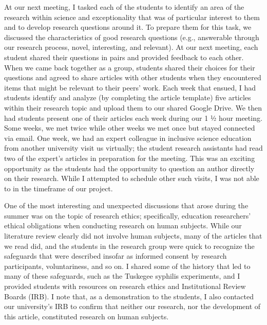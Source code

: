 \documentclass[11.5pt]{sig-alternate}
\begin{document}
\begin{large}
At our next meeting, I tasked each of the students to identify an area of the research within science and exceptionality that was of particular interest to them and to develop research questions around it.  To prepare them for this task, we discussed the characteristics of good research questions (e.g., answerable through our research process, novel, interesting, and relevant).  At our next meeting, each student shared their questions in pairs and provided feedback to each other.  When we came back together as a group, students shared their choices for their questions and agreed to share articles with other students when they encountered items that might be relevant to their peers’ work.  Each week that ensued, I had students identify and analyze (by completing the article template) five articles within their research topic and upload them to our shared Google Drive.  We then had students present one of their articles each week during our 1 ½ hour meeting.  Some weeks, we met twice while other weeks we met once but stayed connected via email.  One week, we had an expert colleague in inclusive science education from another university visit us virtually; the student research assistants had read two of the expert’s articles in preparation for the meeting. This was an exciting opportunity as the students had the opportunity to question an author directly on their research. While I attempted to schedule other such visits, I was not able to in the timeframe of our project.

One of the most interesting and unexpected discussions that arose during the summer was on the topic of research ethics; specifically, education researchers’ ethical obligations when conducting research on human subjects. While our literature review clearly did not involve human subjects, many of the articles that we read did, and the students in the research group were quick to recognize the safeguards that were described insofar as informed consent by research participants, voluntariness, and so on.  I shared some of the history that led to many of these safeguards, such as the Tuskegee syphilis experiments, and I provided students with resources on research ethics and Institutional Review Boards (IRB).  I note that, as a demonstration to the students, I also contacted our university’s IRB to confirm that neither our research, nor the development of this article, constituted research on human subjects.     


\end{large}
\end{document}
